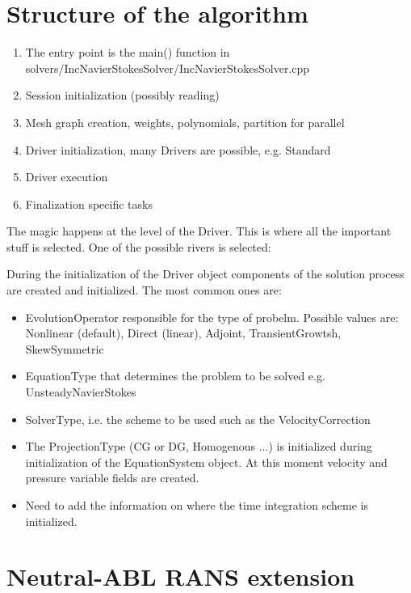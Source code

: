 \section{Structure of the algorithm}


\begin{enumerate}
    \item The entry point is the main() function in solvers/IncNavierStokesSolver/IncNavierStokesSolver.cpp
    \item Session initialization (possibly reading)
    \item Mesh graph creation, weights, polynomials, partition for parallel
    \item Driver initialization, many Drivers are possible, e.g. Standard
    \item Driver execution
    \item Finalization specific tasks
\end{enumerate}

The magic happens at the level of the Driver.
This is where all the important stuff is selected.
One of the possible rivers is selected:
\begin{figure}
\centering

\end{figure}

During the initialization of the Driver object components of the solution process are created and initialized.
The most common ones are:
\begin{itemize}
    \item EvolutionOperator responsible for the type of probelm. Possible values are:
    Nonlinear (default), Direct (linear), Adjoint, TransientGrowtsh, SkewSymmetric
    \item EquationType that determines the problem to be solved e.g. UnsteadyNavierStokes
    \item SolverType, i.e. the scheme to be used such as the VelocityCorrection
    \item The ProjectionType (CG or DG, Homogenous ...)
    is initialized during initialization of the EquationSystem object.
    At this moment velocity and pressure variable fields are created.
    \item Need to add the information on where the time integration scheme is initialized.
\end{itemize}

\section{Neutral-ABL RANS extension}
\label{sec:neutral-abl-rans-development}

